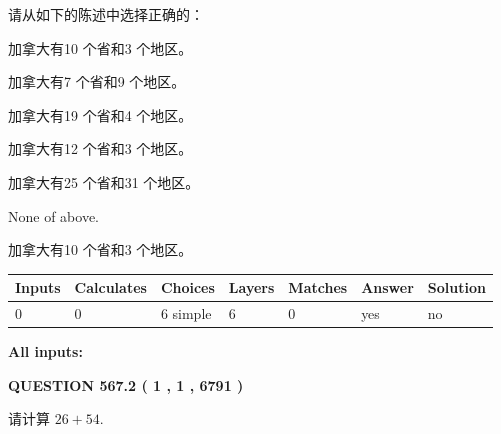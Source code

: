 \documentclass{ctexart}
\begin{document}
  
请从如下的陈述中选择正确的：
 
 
加拿大有10 个省和3 个地区。
 
 
加拿大有7 个省和9 个地区。
 
 
加拿大有19 个省和4 个地区。
 
 
加拿大有12 个省和3 个地区。
 
 
加拿大有25 个省和31 个地区。
 
 
 None of above.
 
 
\noindent{}
 
 
加拿大有10 个省和3 个地区。
 
 
\noindent{}
 
 
   
   
   
   
\noindent\begin{tabular}{|l|l|l|l|l|l|l|}
 \hline
Inputs & Calculates & Choices & Layers & Matches & Answer & Solution \\ \hline
 0  & 
 0  & 
 6
  simple  
  & 
 6  & 
 0  & 
  yes & 
  no 
  \\ \hline
 \end{tabular}
   
   
   
   
\noindent{}
   
   
   
   
\noindent\vspace{0.1in}\hspace{-0.08in} {\textbf{\Large{All inputs: }}}
   
   
  
\vspace{0.2in}
  
{\textbf{\Large{QUESTION
567.2 
 ( 1 , 1 , 6791 )
}}}
  
  
 
请计算 $ %
26 +  %
54 $.
 
 
 
\noindent{}
 
\end{document}
